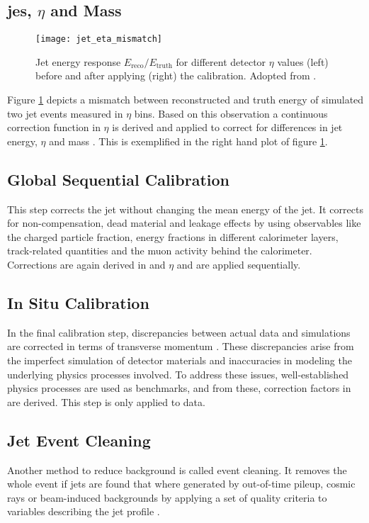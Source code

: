 \subsection{\ac{jes}, $\eta$ and Mass}
\begin{figure}
  \centering
  \texttt{[image: jet\_eta\_mismatch]}
  \caption[]{Jet energy response $E_\text{reco}/E_\text{truth}$ for different detector $\eta$ values (left) before and after applying (right) the calibration. Adopted from \citep{jet_eta_calib}.}
  \label{fig:jet_eta_mismatch}
\end{figure}
Figure \ref{fig:jet_eta_mismatch} depicts a mismatch between reconstructed and truth energy of simulated two jet events measured in $\eta$ bins. Based on this observation a continuous correction function in $\eta$ is derived and applied to correct for differences in jet energy, $\eta$ and mass \citep{atlas2011jet,Aaboud:2019aa}. This is exemplified in the right hand plot of figure \ref{fig:jet_eta_mismatch}.

\subsection{Global Sequential Calibration}
This step corrects the jet \pt without changing the mean energy of the jet. It corrects for non-compensation, dead material and leakage effects by using observables like the charged particle fraction, energy fractions in different calorimeter layers, track-related quantities and the muon activity behind the calorimeter. Corrections are again derived in \pt and $\eta$ and are applied sequentially.

\subsection{In Situ Calibration}
In the final calibration step, discrepancies between actual data and simulations are corrected in terms of transverse momentum \pt. These discrepancies arise from the imperfect simulation of detector materials and inaccuracies in modeling the underlying physics processes involved. To address these issues, well-established physics processes are used as benchmarks, and from these, correction factors in \pt are derived. This step is only applied to data.

\subsection{Jet Event Cleaning}
Another method to reduce background is called event cleaning. It removes the whole event if jets are found that where generated by out-of-time pileup, cosmic rays or beam-induced backgrounds by applying a set of quality criteria to variables describing the jet profile \citep{ATLAS-CONF-2015-029}.

